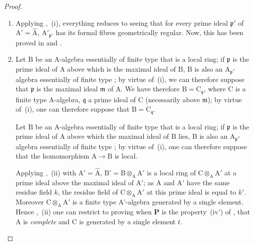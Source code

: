 \begin{proof}
\begin{enumerate}[label=(\roman*)]
  \item Applying ,~(i), everything reduces to seeing that for every prime ideal $\mathfrak{p}'$ of $\mathrm{A}'=\widehat{\mathrm{A}}$, $\mathrm{A}'_{\mathfrak{p}'}$ has its formal fibres geometrically regular.
  Now, this has been proved in  and .

  \item Let $\mathrm{B}$ be an A-algebra essentially of finite type that is a local ring; if $\mathfrak{p}$ is the prime ideal of $\mathrm{A}$ above which is the maximal ideal of $\mathrm{B}$, $\mathrm{B}$ is also an $\mathrm{A}_\mathfrak{p}$-algebra essentially of finite type ; by virtue of~(i), we can therefore suppose that $\mathfrak{p}$ is the maximal ideal $\mathfrak{m}$ of $\mathrm{A}$.
  We have therefore $\mathrm{B}=\mathrm{C}_\mathfrak{q}$, where $\mathrm{C}$ is a finite type A-algebra, $\mathfrak{q}$ a prime ideal of $\mathrm{C}$ (necessarily above $\mathfrak{m}$); by virtue of~(i), one can therefore suppose that $\mathrm{B}=\mathrm{C}_\mathfrak{q}$.

  Let $\mathrm{B}$ be an A-algebra essentially of finite type that is a local ring; if $\mathfrak{p}$ is the prime ideal of $\mathrm{A}$ above which the maximal ideal of $\mathrm{B}$ lies, $\mathrm{B}$ is also an $\mathrm{A}_\mathfrak{p}$-algebra essentially of finite type ; by virtue of~(i), one can therefore suppose that the homomorphism $\mathrm{A}\to\mathrm{B}$ is local.

  Applying ,~(ii) with $\mathrm{A}'=\widehat{\mathrm{A}}$, $\mathrm{B}'=\mathrm{B}\otimes_\mathrm{A}\mathrm{A}'$ is a local ring of $\mathrm{C}\otimes_\mathrm{A}\mathrm{A}'$ at a prime ideal above the maximal ideal of $\mathrm{A}'$; as $\mathrm{A}$ and $\mathrm{A}'$ have the same residue field $k$, the residue field of $\mathrm{C}\otimes_\mathrm{A}\mathrm{A}'$ at this prime ideal is equal to $k'$.
  Moreover $\mathrm{C}\otimes_\mathrm{A}\mathrm{A}'$ is a finite type A'-algebra generated by a single element.
  Hence ,~(ii) one can restrict to proving  when $\boldsymbol{P}$ is the property~(iv') of , that $\mathrm{A}$ is \emph{complete} and $\mathrm{C}$ is generated by a single element $t$.
\end{enumerate}
\end{proof}

